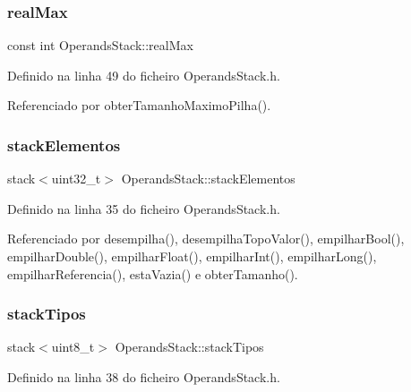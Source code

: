 \subsubsection{\texorpdfstring{real\+Max}{realMax}}
{\footnotesize\ttfamily const int Operands\+Stack\+::real\+Max\hspace{0.3cm}{\ttfamily [private]}}



Definido na linha 49 do ficheiro Operands\+Stack.\+h.



Referenciado por obter\+Tamanho\+Maximo\+Pilha().

\mbox{\label{classOperandsStack_a4d7bd7c3814e216168022849158c733d}} 
\subsubsection{\texorpdfstring{stack\+Elementos}{stackElementos}}
{\footnotesize\ttfamily stack$<$uint32\+\_\+t$>$ Operands\+Stack\+::stack\+Elementos\hspace{0.3cm}{\ttfamily [private]}}



Definido na linha 35 do ficheiro Operands\+Stack.\+h.



Referenciado por desempilha(), desempilha\+Topo\+Valor(), empilhar\+Bool(), empilhar\+Double(), empilhar\+Float(), empilhar\+Int(), empilhar\+Long(), empilhar\+Referencia(), esta\+Vazia() e obter\+Tamanho().

\mbox{\label{classOperandsStack_ad784cabd1a3153f7a870adf07215189a}} 
\subsubsection{\texorpdfstring{stack\+Tipos}{stackTipos}}
{\footnotesize\ttfamily stack$<$uint8\+\_\+t$>$ Operands\+Stack\+::stack\+Tipos\hspace{0.3cm}{\ttfamily [private]}}



Definido na linha 38 do ficheiro Operands\+Stack.\+h.



